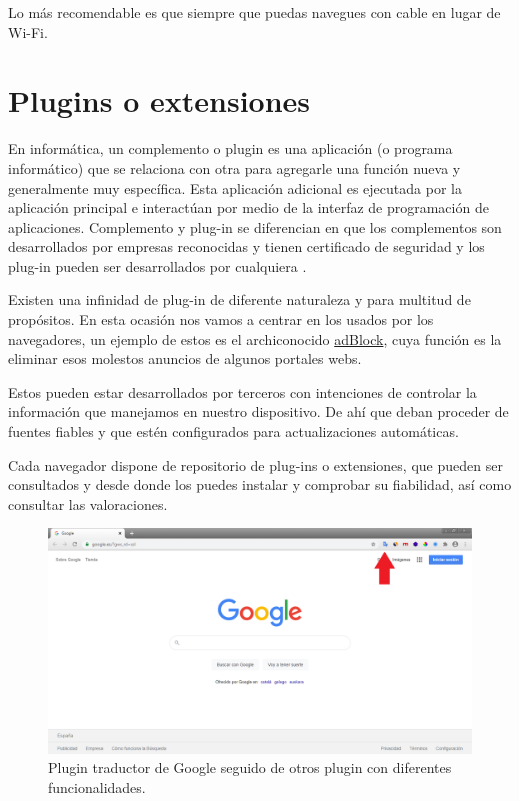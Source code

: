 \documentclass[
  spanish,
  a4paper,
  openany]{book}
\begin{document}
Lo más recomendable es que siempre que puedas navegues con cable en lugar de Wi-Fi.

\hypertarget{plugins-o-extensiones}{%
\section{Plugins o extensiones}\label{plugins-o-extensiones}}

En informática, un complemento o plugin es una aplicación (o programa informático) que se relaciona con otra para agregarle una función nueva y generalmente muy específica. Esta aplicación adicional es ejecutada por la aplicación principal e interactúan por medio de la interfaz de programación de aplicaciones. Complemento y plug-in se diferencian en que los complementos son desarrollados por empresas reconocidas y tienen certificado de seguridad y los plug-in pueden ser desarrollados por cualquiera \citep{IONOS-plugin}.

Existen una infinidad de plug-in de diferente naturaleza y para multitud de propósitos. En esta ocasión nos vamos a centrar en los usados por los navegadores, un ejemplo de estos es el archiconocido \href{https://getadblock.com/}{adBlock}, cuya función es la eliminar esos molestos anuncios de algunos portales webs.

Estos pueden estar desarrollados por terceros con intenciones de controlar la información que manejamos en nuestro dispositivo. De ahí que deban proceder de fuentes fiables y que estén configurados para actualizaciones automáticas.

Cada navegador dispone de repositorio de plug-ins o extensiones, que pueden ser consultados y desde donde los puedes instalar y comprobar su fiabilidad, así como consultar las valoraciones.

\begin{figure}

{\centering \includegraphics[width=0.75\linewidth]{images/plugin-navegador} 

}

\caption{Plugin traductor de Google seguido de otros plugin con diferentes funcionalidades.}\label{fig:unnamed-chunk-12}
\end{figure}
\end{document}
